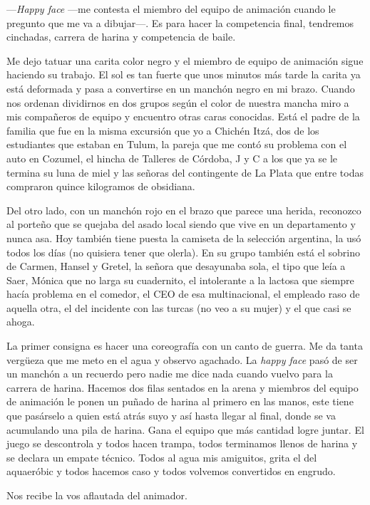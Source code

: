 \documentclass[12pt,twoside,openright,a5paper]{book}
\begin{document}
---\emph{Happy face} ---me contesta el miembro del equipo de animación cuando
le pregunto que me va a dibujar---. Es para hacer la competencia final,
tendremos cinchadas, carrera de harina y competencia de baile.

Me dejo tatuar una carita color negro y el miembro de equipo de animación
sigue haciendo su trabajo. El sol es tan fuerte que unos minutos más tarde
la carita ya está deformada y pasa a convertirse en un manchón negro en mi
brazo. Cuando nos ordenan dividirnos en dos grupos según el color de nuestra
mancha miro a mis compañeros de equipo y encuentro otras caras
conocidas. Está el padre de la familia que fue en la misma excursión que
yo a Chichén Itzá, dos de los estudiantes que estaban en Tulum, la pareja
que me contó su problema con el auto en Cozumel, el hincha de Talleres
de Córdoba, J y C a los que ya se le termina su luna de miel y las señoras
del contingente de La Plata que entre todas compraron quince kilogramos de obsidiana.

Del otro lado, con un manchón rojo en el brazo que parece una herida,
reconozco al porteño que se quejaba del asado local siendo que vive en
un departamento y nunca asa. Hoy también tiene puesta la camiseta de
la selección argentina, la usó todos los días (no quisiera tener que
olerla). En su grupo también está el sobrino de Carmen, Hansel y Gretel,
la señora que desayunaba sola, el tipo que leía a Saer, Mónica que no
larga su cuadernito, el intolerante a la lactosa que siempre hacía problema
en el comedor, el CEO de esa multinacional, el empleado raso de aquella otra,
el del incidente con las turcas (no veo a su mujer) y el que casi se ahoga.

La primer consigna es hacer una coreografía con un canto de guerra. Me da
tanta vergüeza que me meto en el agua y observo agachado. La \emph{happy face} pasó
de ser un manchón a un recuerdo pero nadie me dice nada cuando vuelvo para
la carrera de harina. Hacemos dos filas sentados en la arena y miembros del
equipo de animación le ponen un puñado de harina al primero en las manos,
este tiene que pasárselo a quien está atrás suyo y así hasta llegar
al final, donde se va acumulando una pila de harina. Gana el equipo que
más cantidad logre juntar. El juego se descontrola y todos hacen trampa,
todos terminamos llenos de harina y se declara un empate técnico. Todos
al agua mis amiguitos, grita el del aquaeróbic y todos hacemos caso y todos
volvemos convertidos en engrudo.

Nos recibe la vos aflautada del animador.
\end{document}
